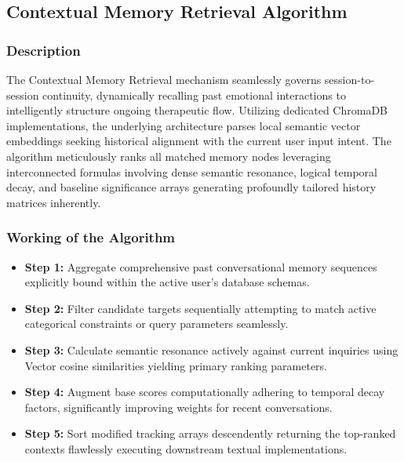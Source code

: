 \documentclass[11pt]{report}
\begin{document}
\subsection{Contextual Memory Retrieval Algorithm}

\subsubsection*{Description}
The Contextual Memory Retrieval mechanism seamlessly governs session-to-session continuity, dynamically recalling past emotional interactions to intelligently structure ongoing therapeutic flow. Utilizing dedicated ChromaDB implementations, the underlying architecture parses local semantic vector embeddings seeking historical alignment with the current user input intent. The algorithm meticulously ranks all matched memory nodes leveraging interconnected formulas involving dense semantic resonance, logical temporal decay, and baseline significance arrays generating profoundly tailored history matrices inherently.

\subsubsection*{Working of the Algorithm}
\begin{itemize}
    \item \textbf{Step 1:} Aggregate comprehensive past conversational memory sequences explicitly bound within the active user’s database schemas.
    \item \textbf{Step 2:} Filter candidate targets sequentially attempting to match active categorical constraints or query parameters seamlessly.
    \item \textbf{Step 3:} Calculate semantic resonance actively against current inquiries using Vector cosine similarities yielding primary ranking parameters.
    \item \textbf{Step 4:} Augment base scores computationally adhering to temporal decay factors, significantly improving weights for recent conversations.
    \item \textbf{Step 5:} Sort modified tracking arrays descendently returning the top-ranked contexts flawlessly executing downstream textual implementations.
\end{itemize}
\end{document}
